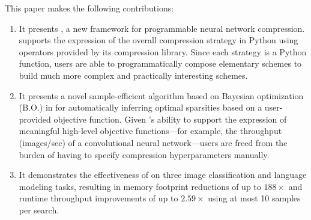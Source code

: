 This paper makes the following contributions:
\begin{enumerate}
    \item It presents \algoName, a new framework for programmable neural network compression. \algoName supports the expression of
the overall compression strategy in Python using operators provided by its compression library. 
%
Since each strategy is a Python function, users are  
able to programmatically compose elementary schemes to build much
more complex and practically interesting schemes.

\item It presents a novel sample-efficient algorithm based on Bayesian optimization (B.O.) in \algoName for automatically inferring optimal sparsities based on a user-provided objective function. Given \algoName's ability to support the expression of meaningful high-level
objective functions---for example, the throughput (images/sec) of a convolutional neural network---users
are freed from the burden of having to specify compression hyperparameters manually.

\item It demonstrates the effectiveness of \algoName on three image classification and language modeling tasks, resulting in memory footprint reductions of up to $188\times$ and runtime throughput improvements of up to $2.59\times$ using at most 10 samples per search.
\end{enumerate}